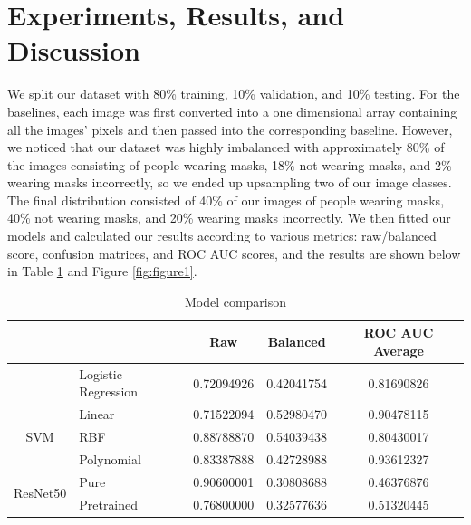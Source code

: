 \documentclass{article}
\begin{document}
\section{Experiments, Results, and Discussion}
We split our dataset with 80\% training, 10\% validation, and 10\% testing. For the baselines, each image was first converted into a one dimensional array containing all the images’ pixels and then passed into the corresponding baseline. However, we noticed that our dataset was highly imbalanced with approximately 80\% of the images consisting of people wearing masks, 18\% not wearing masks, and 2\% wearing masks incorrectly, so we ended up upsampling two of our image classes. The final distribution consisted of 40\% of our images of people wearing masks, 40\% not wearing masks, and 20\% wearing masks incorrectly. We then fitted our models and calculated our results according to various metrics: raw/balanced score, confusion matrices, and ROC AUC scores, and the results are shown below in Table \ref{tab:table1} and Figure \ref{fig:figure1}.

\begin{table}[h!]
\begin{center}
\caption{Model comparison}
\label{tab:table1}
\bgroup
\def\arraystretch{1.5}
\begin{tabular}{llccc}
  \hline
                                                              &                     & Raw        & Balanced   & ROC AUC Average \\ \hline \hline
                                                              & Logistic Regression & 0.72094926 & 0.42041754 & 0.81690826      \\ \hline
  \multicolumn{1}{c}{\multirow{3}{*}{SVM}} & Linear              & 0.71522094 & 0.52980470 & 0.90478115      \\
  \multicolumn{1}{c}{}                                        & RBF                 & 0.88788870 & 0.54039438 & 0.80430017      \\
  \multicolumn{1}{c}{}                                        & Polynomial          & 0.83387888 & 0.42728988 & 0.93612327      \\ \hline
  \multirow{2}{*}{ResNet50}                                   & Pure                & 0.90600001 & 0.30808688 & 0.46376876      \\
                                                              & Pretrained          & 0.76800000 & 0.32577636 & 0.51320445      \\ \hline \hline
  \end{tabular}
\egroup
\end{center}
\end{table}
\end{document}
